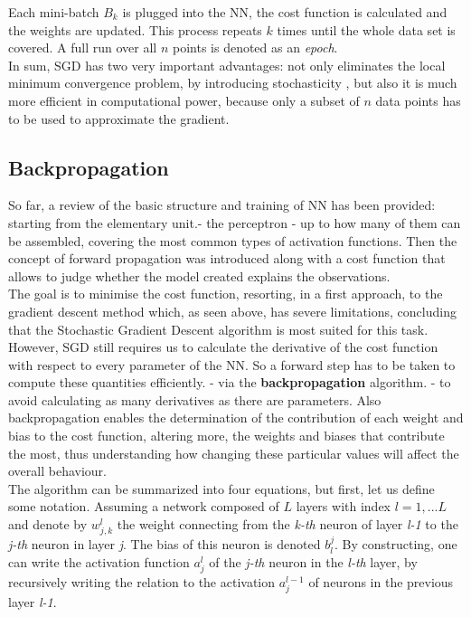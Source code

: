 Each mini-batch $B_k$ is plugged into the NN, the cost function is calculated and the weights are updated. This process repeats $k$ times until the whole data set is covered. A full run over all $n$ points is denoted as an \textit{epoch}. \cite{ml_phys}
\\

In sum, SGD has two very important advantages: not only eliminates the local minimum convergence problem, by introducing stochasticity , but also it is much more efficient in computational power, because only a subset of $n$ data points has to be used to approximate the gradient.


\subsection{Backpropagation}

So far, a review of the basic structure and training of NN has been provided: starting from the elementary unit.- the perceptron - up to how many of them can be assembled, covering the most common types of activation functions. Then the concept of forward propagation was introduced along with a cost function that allows to judge whether the model created explains the observations. 
\\

The goal is to minimise the cost function, resorting, in a first approach, to the gradient descent method which, as seen above, has severe limitations, concluding that the Stochastic Gradient Descent algorithm is most suited for this task. However, SGD still requires us to calculate the derivative of the cost function with respect to every parameter of the NN. So a forward step has to be taken to compute these quantities efficiently. - via the \textbf{backpropagation} algorithm. - to avoid calculating as many derivatives as there are parameters. Also backpropagation enables the determination of the contribution of each weight and bias to the cost function, altering more, the weights and biases that contribute the most, thus understanding how changing these particular values will affect the overall behaviour. \cite{nielsenneural}
\\

The algorithm can be summarized into four equations, but first, let us define some notation. Assuming a network composed of $L$ layers with index $l = {1,... L}$ and denote by $w_{j,k}^l$ the weight connecting from the \textit{k-th} neuron of layer \textit{l-1} to the \textit{j-th} neuron in layer \textit{j}. The bias of this neuron is denoted $b_l^j$. By constructing, one can write the activation function $a_j^l$ of the  \textit{j-th} neuron in the  \textit{l-th} layer, by recursively writing the relation to the activation $a_j^{l-1}$ of neurons in the previous layer \textit{l-1}.

